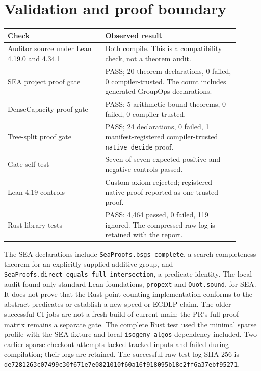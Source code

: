 \documentclass[10pt]{article}
\newcommand{\mono}[1]{\texttt{#1}}
\begin{document}
\section*{Validation and proof boundary}
\begin{tabular}{|p{0.38\linewidth}|p{0.52\linewidth}|}\hline
Check & Observed result \\ \hline
Auditor source under Lean 4.19.0 and 4.34.1 & Both compile. This is a compatibility check, not a theorem audit. \\ \hline
SEA project proof gate & PASS; 20 theorem declarations, 0 failed, 0 compiler-trusted. The count includes generated GroupOps declarations. \\ \hline
DenseCapacity proof gate & PASS; 5 arithmetic-bound theorems, 0 failed, 0 compiler-trusted. \\ \hline
Tree-split proof gate & PASS; 24 declarations, 0 failed, 1 manifest-registered compiler-trusted \mono{native\_decide} proof. \\ \hline
Gate self-test & Seven of seven expected positive and negative controls passed. \\ \hline
Lean 4.19 controls & Custom axiom rejected; registered native proof reported as one trusted proof. \\ \hline
Rust library tests & PASS: 4,464 passed, 0 failed, 119 ignored. The compressed raw log is retained with the report. \\ \hline
\end{tabular}

The SEA declarations include \mono{SeaProofs.bsgs\_complete}, a search
completeness theorem for an explicitly supplied additive group, and
\mono{SeaProofs.direct\_equals\_full\_intersection}, a predicate identity.
The local audit found only standard Lean foundations, \mono{propext} and
\mono{Quot.sound}, for SEA. It does not prove that the Rust point-counting
implementation conforms to the abstract predicates or establish a new speed
or ECDLP claim. The older successful CI jobs are not a fresh build of current
main; the PR's full proof matrix remains a separate gate.
The complete Rust test used the minimal sparse profile with the SEA fixture
and local \mono{isogeny\_algos} dependency included. Two earlier sparse
checkout attempts lacked tracked inputs and failed during compilation; their
logs are retained. The successful raw test log SHA-256 is
\mono{de7281263c07499c30f671e7e0821010f60a16f918095b18c2ff6a37ebf95271}.
\end{document}
